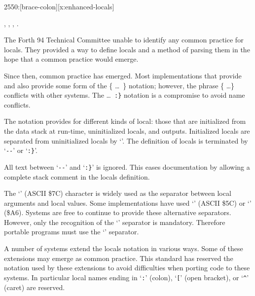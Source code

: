 \begin{worddef}[b:]{2550}{\brace:}[brace-colon][x:enhanced-locals]


\see {},
	,
	,
	.

	\begin{rationale}
		The Forth 94 Technical Committee  unable to identify any common
		practice for locals.  They provided a way to define locals and a method
		of parsing them in the hope that a common practice would emerge.

		Since then, common practice has emerged.  Most implementations that
		provide  and \linebreak {} also provide some form of the
		\{ \ldots\ \} notation; however, the phrase \{ \ldots \} conflicts with
		other systems.  The  \ldots\ \texttt{:\}} notation is a compromise
		to avoid name conflicts.

		The notation provides for different kinds of local: those that are
		initialized from the data stack at run-time, uninitialized locals, and
		outputs.  Initialized locals are separated from uninitialized locals by
		`\texttt{\textbar}'.  The definition of locals is terminated by
		`\texttt{-{}-}' or `\texttt{:\}}'.

		All text between `\texttt{-{}-}' and `\texttt{:\}}' is ignored.  This eases
		documentation by allowing a complete stack comment in the locals definition.

		The `\texttt{\textbar}' (ASCII \$7C) character is widely used as the
		separator between local arguments and local values.  Some implementations
		have used `\texttt{\bs}' (ASCII \$5C) or `\texttt{\textbrokenbar}' (\$A6).
		Systems are free to continue to provide these alternative separators.
		However, only the recognition of the `\texttt{\textbar}' separator is
		mandatory. Therefore portable programs must use the `\texttt{\textbar}'
		separator.

		A number of systems extend the locals notation in various ways.  Some of
		these extensions may emerge as common practice.  This standard has reserved
		the notation used by these extensions to avoid difficulties when porting
		code to these systems.  In particular local names ending in
		`\texttt{:}' (colon),
		`\texttt{[}' (open bracket), or
		`\texttt{\textasciicircum}' (caret) are reserved.
	\end{rationale}


\end{worddef}
